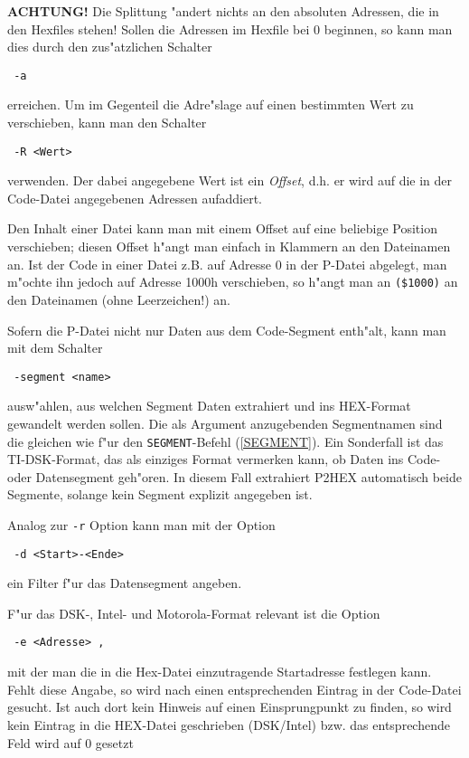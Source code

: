 \documentclass[12pt,a4paper,twoside]{report}
\newcommand{\bb}[1]{{\bf #1}}
\newcommand{\tty}[1]{{\tt #1}}
\begin{document}
\bb{ACHTUNG!} Die Splittung "andert nichts an den absoluten Adressen, die
in den Hexfiles stehen!  Sollen die Adressen im Hexfile bei 0 beginnen,
so kann man dies durch den zus"atzlichen Schalter
\begin{verbatim}
 -a
\end{verbatim}
erreichen.  Um im Gegenteil die Adre"slage auf einen bestimmten Wert zu
verschieben, kann man den Schalter
\begin{verbatim}
 -R <Wert>
\end{verbatim}
verwenden.  Der dabei angegebene Wert ist ein {\em Offset}, d.h. er wird
auf die in der Code-Datei angegebenen Adressen aufaddiert.
\par
Den Inhalt einer Datei kann man mit einem Offset auf eine beliebige
Position verschieben; diesen Offset h"angt man einfach in Klammern an
den Dateinamen an.  Ist der Code in einer Datei z.B. auf Adresse 0 in
der P-Datei abgelegt, man m"ochte ihn jedoch auf Adresse 1000h
verschieben, so h"angt man an \tty{(\$1000)} an den Dateinamen (ohne
Leerzeichen!) an.
\par
Sofern die P-Datei nicht nur Daten aus dem Code-Segment enth"alt, kann
man mit dem Schalter
\begin{verbatim}
 -segment <name>
\end{verbatim}
ausw"ahlen, aus welchen Segment Daten extrahiert und ins HEX-Format
gewandelt werden sollen.  Die als Argument anzugebenden Segmentnamen sind
die gleichen wie f"ur den \tty{SEGMENT}-Befehl (\ref{SEGMENT}). Ein
Sonderfall ist das TI-DSK-Format, das als einziges Format vermerken kann,
ob Daten ins Code- oder Datensegment geh"oren.  In diesem Fall extrahiert
P2HEX automatisch beide Segmente, solange kein Segment explizit angegeben
ist.
\par
Analog zur \verb!-r! Option kann man mit der Option 
\begin{verbatim}
 -d <Start>-<Ende>
\end{verbatim}
ein Filter f"ur das Datensegment angeben.
\par
F"ur das DSK-, Intel- und Motorola-Format relevant ist die Option
\begin{verbatim}
 -e <Adresse> ,
\end{verbatim}
mit der man die in die Hex-Datei einzutragende Startadresse festlegen
kann.  Fehlt diese Angabe, so wird nach einen entsprechenden Eintrag
in der Code-Datei gesucht.  Ist auch dort kein Hinweis auf einen
Einsprungpunkt zu finden, so wird kein Eintrag in die HEX-Datei
geschrieben (DSK/Intel) bzw. das entsprechende Feld wird auf 0 gesetzt
\end{document}
